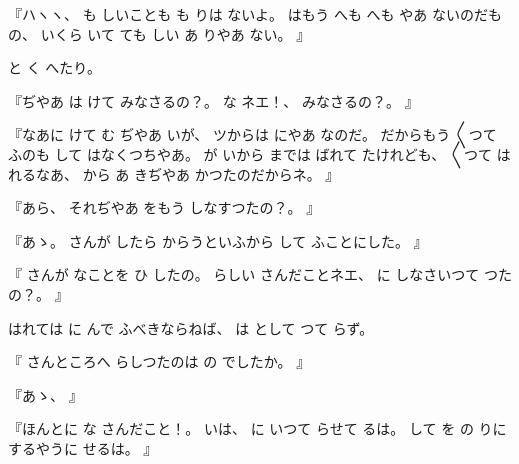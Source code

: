 『ハヽヽ、
%
も
しいことも
も
りは
ないよ。
%
はもう
へも
へも
やあ
ないのだもの、
%
いくら
いて
ても
しい
あ
りやあ
ない。
』

と
く
へたり。

『ぢやあ
は
けて
みなさるの？。
%
な
ネエ！、
%
みなさるの？。
』

『なあに
けて
む
ぢやあ
いが、
%
ツからは
にやあ
なのだ。
%
だからもう
〳〵つて
ふのも
して
はなくつちやあ。
%
が
いから
までは
ばれて
たけれども、
%
〳〵つて
はれるなあ、
%
から
あ
きぢやあ
かつたのだからネ。
』

『あら、
%
それぢやあ
をもう
しなすつたの？。
』

『あゝ。
%
さんが
したら
からうといふから
して
ふことにした。
』

『
さんが
なことを
ひ
したの。
%
らしい
さんだことネエ、
%
に
しなさいつて
つたの？。
』

はれては
に
んで
ふべきならねば、
%
は
として
つて
らず。

『
さんところへ
らしつたのは
の
でしたか。
』

『あゝ、
』

『ほんとに
な
さんだこと！。
%
いは、
%
に
いつて
らせて
るは。
%
して
を
の
りにするやうに
せるは。
』

